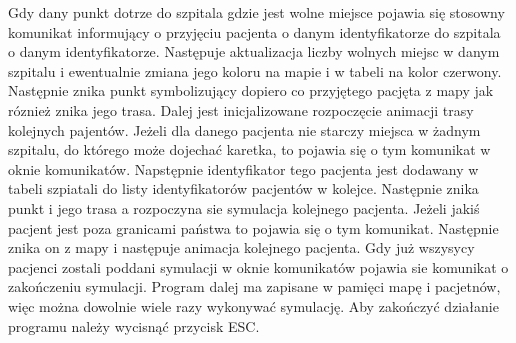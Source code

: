 \documentclass[10pt,a4paper]{article}
\begin{document}
Gdy dany punkt dotrze do szpitala gdzie jest wolne miejsce pojawia się stosowny komunikat informujący o przyjęciu pacjenta o danym identyfikatorze do szpitala o danym identyfikatorze. Następuje aktualizacja liczby wolnych miejsc w danym szpitalu i ewentualnie zmiana jego koloru na mapie i w tabeli na kolor czerwony. Następnie znika punkt symbolizujący dopiero co przyjętego pacjęta z mapy jak róznież znika jego trasa. Dalej jest inicjalizowane rozpoczęcie animacji trasy kolejnych pajentów. Jeżeli dla danego pacjenta nie starczy miejsca w żadnym szpitalu, do którego może dojechać karetka, to pojawia się o tym komunikat w oknie komunikatów. Napstępnie identyfikator tego pacjenta jest dodawany w tabeli szpiatali do listy identyfikatorów pacjentów w kolejce. Następnie znika punkt i jego trasa a rozpoczyna sie symulacja kolejnego pacjenta. Jeżeli jakiś pacjent jest poza granicami państwa to pojawia się o tym komunikat. Następnie znika on z mapy i następuje animacja kolejnego pacjenta. Gdy już wszysycy pacjenci zostali poddani symulacji w oknie komunikatów pojawia sie komunikat o zakończeniu symulacji. Program dalej ma zapisane w pamięci mapę i pacjetnów, więc można dowolnie wiele razy wykonywać symulację. Aby zakończyć działanie programu należy wycisnąć przycisk ESC.
\end{document}
